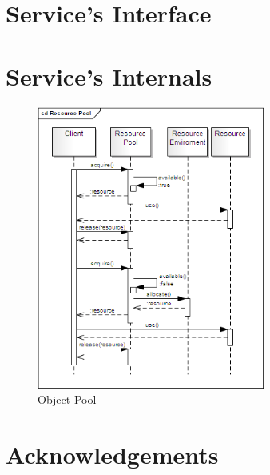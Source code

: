 \documentclass[11pt]{article}
\begin{document}
\section{Service's Interface}


\section{Service's Internals}

\begin{figure}[!ht]
\begin{center}
\includegraphics[width=7.5cm]{resource_pool}
\end{center}
\caption{Object Pool}
\label{fig:rp}
\end{figure}

\section{Acknowledgements}





\end{document}
